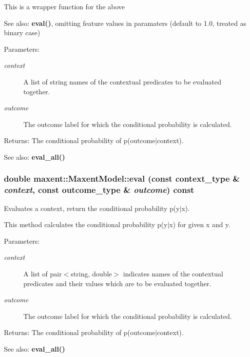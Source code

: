 This is a wrapper function for the above \begin{Desc}
\item[See also:]{\bf eval()}, omitting feature values in paramaters (default to 1.0, treated as binary case)\end{Desc}
\begin{Desc}
\item[Parameters:]
\begin{description}
\item[{\em context}]A list of string names of the contextual predicates to be evaluated together. \item[{\em outcome}]The outcome label for which the conditional probability is calculated. \end{description}
\end{Desc}
\begin{Desc}
\item[Returns:]The conditional probability of p(outcome$|$context). \end{Desc}
\begin{Desc}
\item[See also:]{\bf eval\_\-all()} \end{Desc}
\subsubsection{\setlength{\rightskip}{0pt plus 5cm}double maxent::Maxent\-Model::eval (const context\_\-type \& {\em context}, const outcome\_\-type \& {\em outcome}) const}\label{classmaxent_1_1MaxentModel_a3}


Evaluates a context, return the conditional probability p(y$|$x). 

This method calculates the conditional probability p(y$|$x) for given x and y.

\begin{Desc}
\item[Parameters:]
\begin{description}
\item[{\em context}]A list of pair$<$string, double$>$ indicates names of the contextual predicates and their values which are to be evaluated together. \item[{\em outcome}]The outcome label for which the conditional probability is calculated. \end{description}
\end{Desc}
\begin{Desc}
\item[Returns:]The conditional probability of p(outcome$|$context). \end{Desc}
\begin{Desc}
\item[See also:]{\bf eval\_\-all()} \end{Desc}

